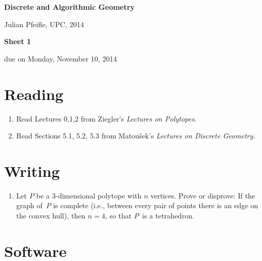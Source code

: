 \documentclass[11pt]{amsart}
\begin{document}
\begin{center}
\textbf{\sffamily
   Discrete and Algorithmic Geometry }

\medskip
   Julian Pfeifle,
   UPC, 2014 \mbox{}
\end{center}

\bigskip

\begin{center}
  \textbf{\sffamily Sheet 1}

\bigskip
 due on Monday, November 10, 2014

\end{center}

\bigskip
\bigskip
\bigskip

\section*{Reading}

\begin{enumerate}
\setlength{\itemsep}{2ex}
\item Read Lectures 0,1,2 from Ziegler's \emph{Lectures on Polytopes}.

\item Read Sections 5.1, 5.2, 5.3 from Matou\v sek's \emph{Lectures on
    Discrete Geometry}.

\end{enumerate}

\bigskip
\bigskip
\section*{Writing}

\begin{enumerate}
\item Let $P$ be a $3$-dimensional polytope with $n$
  vertices. 
  Prove or disprove: 
  If the graph of~$P$ is complete (i.e., between every pair of points
  there is an edge on the convex hull), then $n=4$, so that $P$~is a tetrahedron.
\end{enumerate}

\bigskip
\bigskip
\section*{Software}
\end{document}
